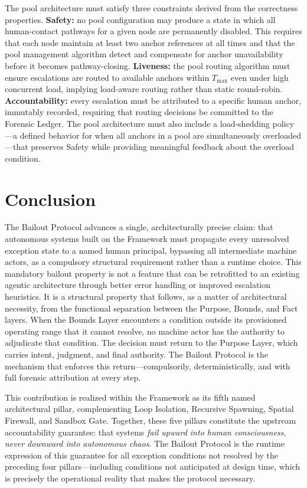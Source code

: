 The pool architecture must satisfy three constraints derived from the correctness properties. \textbf{Safety:} no pool configuration may produce a state in which all human-contact pathways for a given node are permanently disabled. This requires that each node maintain at least two anchor references at all times and that the pool management algorithm detect and compensate for anchor unavailability before it becomes pathway-closing. \textbf{Liveness:} the pool routing algorithm must ensure escalations are routed to available anchors within $T_{\max}$ even under high concurrent load, implying load-aware routing rather than static round-robin. \textbf{Accountability:} every escalation must be attributed to a specific human anchor, immutably recorded, requiring that routing decisions be committed to the Forensic Ledger. The pool architecture must also include a load-shedding policy---a defined behavior for when all anchors in a pool are simultaneously overloaded---that preserves Safety while providing meaningful feedback about the overload condition.

\section{Conclusion}\label{sec:conclusion}

The Bailout Protocol advances a single, architecturally precise claim: that autonomous systems built on the \bxthree{} Framework must propagate every unresolved exception state to a named human principal, bypassing all intermediate machine actors, as a compulsory structural requirement rather than a runtime choice. This mandatory bailout property is not a feature that can be retrofitted to an existing agentic architecture through better error handling or improved escalation heuristics. It is a structural property that follows, as a matter of architectural necessity, from the functional separation between the Purpose, Bounds, and Fact layers. When the Bounds Layer encounters a condition outside its provisioned operating range that it cannot resolve, no machine actor has the authority to adjudicate that condition. The decision must return to the Purpose Layer, which carries intent, judgment, and final authority. The Bailout Protocol is the mechanism that enforces this return---compulsorily, deterministically, and with full forensic attribution at every step.

This contribution is realized within the \bxthree{} Framework as its fifth named architectural pillar, complementing Loop Isolation, Recursive Spawning, Spatial Firewall, and Sandbox Gate. Together, these five pillars constitute the upstream accountability guarantee: that \bxthree{} systems \emph{fail upward into human consciousness, never downward into autonomous chaos}. The Bailout Protocol is the runtime expression of this guarantee for all exception conditions not resolved by the preceding four pillars---including conditions not anticipated at design time, which is precisely the operational reality that makes the protocol necessary.

